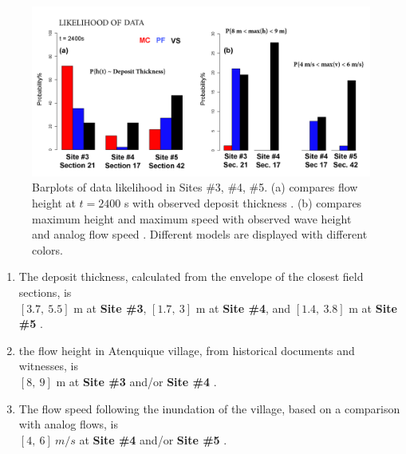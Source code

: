 \documentclass[nhess, manuscript]{copernicus}
\begin{document}
\begin{figure}[H]
\centering
\includegraphics[width=1\textwidth]{Fig10.png}
\caption{Barplots of data likelihood in Sites \#3, \#4, \#5. (a) compares flow height at $t=2400$ s with observed deposit thickness \citep{Saucedo2008}. (b) compares maximum height and maximum speed with observed wave height \citep{PonceSegura1983} and analog flow speed \citep{Pierson1985}. Different models are displayed with different colors.}
\label{Fig10}
\end{figure}
\begin{enumerate}
\item The deposit thickness, calculated from the envelope of the closest field sections, is \\ $[3.7,\ 5.5]$ m at \textbf{Site \#3}, $[1.7,\ 3]$ m at \textbf{Site \#4}, and $[1.4,\ 3.8]$ m at \textbf{Site \#5} \citep{Saucedo2008}.
\item the flow height in Atenquique village, from historical documents and witnesses, is \\$[8,\ 9]$ m at \textbf{Site \#3} and/or \textbf{Site \#4} \citep{PonceSegura1983, Saucedo2008}.
\item The flow speed following the inundation of the village, based on a comparison with analog flows, is \\$[4,\ 6]\ m/s$ at \textbf{Site \#4} and/or \textbf{Site \#5} \citep{Pierson1985, Saucedo2008}.
\end{enumerate}
\end{document}
